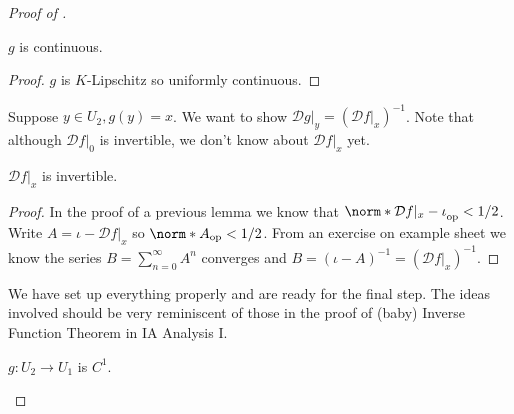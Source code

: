 \documentclass[a4paper]{article}
\newcommand*{\D}{\mathcal{D}}
\newcommand*{\nop}[1]{\norm*{#1}_{\text{op}}}
\theoremstyle{definition}
\begin{document}
\begin{proof}[Proof of ]
  \begin{corollary}
    \(g\) is continuous.
  \end{corollary}

  \begin{proof}
    \(g\) is \(K\)-Lipschitz so uniformly continuous.
  \end{proof}

  Suppose \(y \in U_2, g(y) = x\). We want to show \(\D g|_y = (\D f|_x)^{-1}\). Note that although \(\D f|_0\) is invertible, we don't know about \(\D f|_x\) yet.

  \begin{lemma}
    \(\D f|_x\) is invertible.
  \end{lemma}
  
  \begin{proof}
    In the proof of a previous lemma we know that \(\nop{\D f|_x - \iota} < 1/2\). Write \(A = \iota - \D f|_x\) so \(\nop A < 1/2\). From an exercise on example sheet we know the series \(B = \sum_{n = 0}^\infty A^n\) converges and \(B = (\iota - A)^{-1} = (\D f|_x)^{-1}\).
  \end{proof}

  We have set up everything properly and are ready for the final step. The ideas involved should be very reminiscent of those in the proof of (baby) Inverse Function Theorem in IA Analysis I.
  
  \begin{proposition}
    \(g: U_2 \to U_1\) is \(C^1\).
  \end{proposition}


\end{proof}
\end{document}
